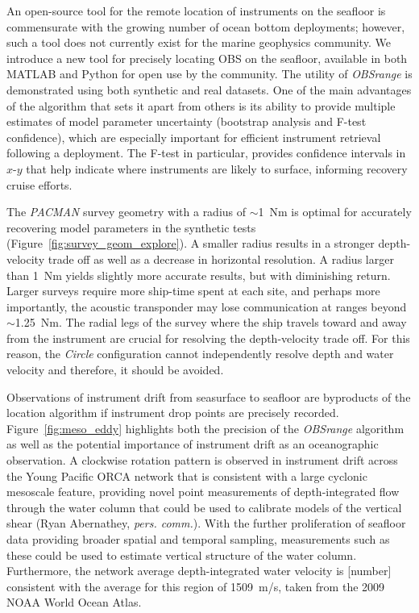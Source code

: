 An open-source tool for the remote location of instruments on the seafloor is commensurate with the growing number of ocean bottom deployments; however, such a tool does not currently exist for the marine geophysics community. We introduce a new tool for precisely locating OBS on the seafloor, available in both MATLAB and Python for open use by the community. The utility of \textit{OBSrange} is demonstrated using both synthetic and real datasets. One of the main advantages of the algorithm that sets it apart from others is its ability to provide multiple estimates of model parameter uncertainty (bootstrap analysis and F-test confidence), which are especially important for efficient instrument retrieval following a deployment. The F-test in particular, provides confidence intervals in $x$-$y$ that help indicate where instruments are likely to surface, informing recovery cruise efforts.

The \textit{PACMAN} survey geometry with a radius of $\sim$1~Nm is optimal for accurately recovering model parameters in the synthetic tests (Figure~\ref{fig:survey_geom_explore}). A smaller radius results in a stronger depth-velocity trade off as well as a decrease in horizontal resolution. A radius larger than 1~Nm yields slightly more accurate results, but with diminishing return. Larger surveys require more ship-time spent at each site, and perhaps more importantly, the acoustic transponder may lose communication at ranges beyond $\sim$1.25~Nm. The radial legs of the survey where the ship travels toward and away from the instrument are crucial for resolving the depth-velocity trade off. For this reason, the \textit{Circle} configuration cannot independently resolve depth and water velocity and therefore, it should be avoided.

Observations of instrument drift from seasurface to seafloor are byproducts of the location algorithm if instrument drop points are precisely recorded. Figure~\ref{fig:meso_eddy} highlights both the precision of the \textit{OBSrange} algorithm as well as the potential importance of instrument drift as an oceanographic observation. A clockwise rotation pattern is observed in instrument drift across the Young Pacific ORCA network that is consistent with a large cyclonic mesoscale feature, providing novel point measurements of depth-integrated flow through the water column that could be used to calibrate models of the vertical shear (Ryan Abernathey, \textit{pers. comm.}). With the further proliferation of seafloor data providing broader spatial and temporal sampling, measurements such as these could be used to estimate vertical structure of the water column. Furthermore, the network average depth-integrated water velocity is [number] consistent with the average for this region of 1509~m/s, taken from the 2009 NOAA World Ocean Atlas.

